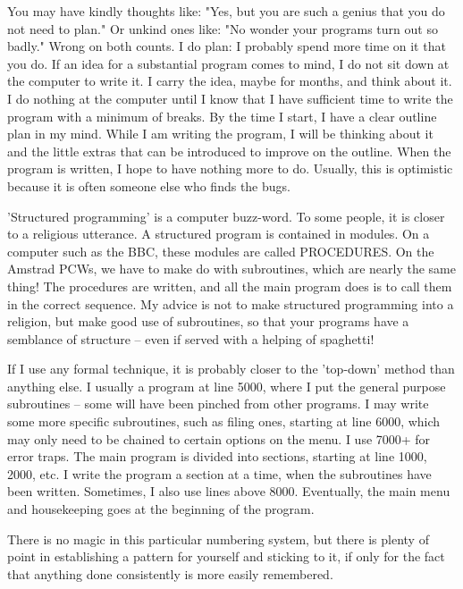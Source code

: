 \documentclass[]{report} %
\begin{document}
You may have kindly thoughts like: "Yes, but you are such a genius that you do 
not  need to plan." Or unkind ones like: "No wonder your programs turn out  so 
badly." Wrong on both counts. I do plan: I probably spend more time on it that 
you do. If an idea for a substantial program comes to mind, I do not sit  down 
at  the  computer to write it. I carry the idea, maybe for months,  and  think 
about  it.  I do nothing at the computer until I know that I  have  sufficient 
time  to  write the program with a minimum of breaks. By the time I  start,  I 
have  a clear outline plan in my mind. While I am writing the program, I  will 
be  thinking about it and the little extras that can be introduced to  improve 
on  the outline. When the program is written, I hope to have nothing  more  to 
do. Usually, this is optimistic because it is often someone else who finds the 
bugs.

'Structured programming' is a computer buzz-word. To some people, it is closer 
to  a religious utterance. A structured program is contained in modules. On  a 
computer such as the BBC, these modules are called PROCEDURES. On the  Amstrad 
PCWs,  we have to make do with subroutines, which are nearly the  same  thing! 
The  procedures are written, and all the main program does is to call them  in 
the  correct sequence. My advice is not to make structured programming into  a 
religion,  but  make  good use of subroutines, so that your  programs  have  a 
semblance of structure -- even if served with a helping of spaghetti!

If I use any formal technique, it is probably closer to the 'top-down'  method 
than anything else. I usually a program at line 5000, where I put the  general 
purpose subroutines -- some will have been pinched from other programs. I  may 
write  some more specific subroutines, such as filing ones, starting  at  line 
6000, which may only need to be chained to certain options on the menu. I  use 
7000+ for error traps. The main program is divided into sections, starting  at 
line  1000,  2000,  etc. I write the program a section at  a  time,  when  the 
subroutines  have  been  written.  Sometimes, I also  use  lines  above  8000. 
Eventually,  the  main  menu and housekeeping goes at  the  beginning  of  the 
program.

There is no magic in this particular numbering system, but there is plenty  of 
point  in establishing a pattern for yourself and sticking to it, if only  for 
the fact that anything done consistently is more easily remembered.
\end{document}
